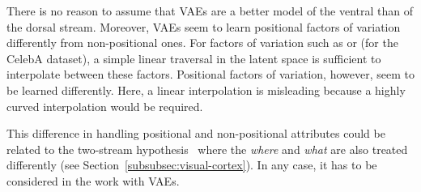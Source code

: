 There is no reason to assume that \acp{VAE} are a better model of the ventral than of the dorsal stream.
Moreover, \acp{VAE} seem to learn positional factors of variation differently from non-positional ones.
For factors of variation such as  or  (for the CelebA dataset), a simple linear traversal in the latent space is sufficient to interpolate between these factors.
Positional factors of variation, however, seem to be learned differently.
Here, a linear interpolation is misleading because a highly curved interpolation would be required.

This difference in handling positional and non-positional attributes could be related to the two-stream hypothesis~\citep{goodale1992separate} where the \textit{where} and \textit{what} are also treated differently (see Section~\ref{subsubsec:visual-cortex}).
In any case, it has to be considered in the work with \acp{VAE}.

